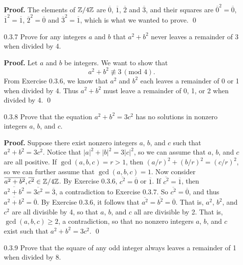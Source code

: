 \begin{enumerate}
      \textbf{Proof.} The elements of $\mathbb{Z}/4\mathbb{Z}$ are $\overline{0}$,
      $\overline{1}$, $\overline{2}$ and $\overline{3}$, and their squares are
      $\overline{0}^2 = \overline{0}$, $\overline{1}^2 = \overline{1}$,
      $\overline{2}^2 = \overline{0}$ and $\overline{3}^2 = \overline{1}$, which
      is what we wanted to prove. \qed
   \item[0.3.7]   Prove for any integers $a$ and $b$ that $a^2 + b^2$ never
                  leaves a remainder of 3 when divided by 4.
                  
      \textbf{Proof.} Let $a$ and $b$ be integers. We want to show that
      $$a^2 + b^2 \not\equiv 3 \,(\text{mod }4).$$
      From Exercise 0.3.6, we know that $a^2$ and $b^2$ each leaves a remainder
      of 0 or 1 when divided by 4. Thus $a^2 + b^2$ must leave a remainder of
      0, 1, or 2 when divided by 4. \qed
   \item[0.3.8]   Prove that the equation $a^2 + b^2 = 3c^2$ has no solutions in
                  nonzero integers $a$, $b$, and $c$.
                  
      \textbf{Proof.} Suppose there exist nonzero integers $a$, $b$, and $c$
      such that $a^2 + b^2 = 3c^2$. Notice that $|a|^2 + |b|^2 = 3|c|^2$, so we
      can assume that $a$, $b$, and $c$ are all positive. If
      $\gcd(a, b, c) = r > 1$, then $(a/r)^2 + (b/r)^2 = (c/r)^2$, so we can
      further assume that $\gcd(a, b, c) = 1$. Now consider
      $\overline{a^2+b^2}, \overline{c^2} \in \mathbb{Z}/4\mathbb{Z}$. By Exercise 0.3.6,
      $\overline{c^2} = \overline{0}$ or $\overline{1}$. If
      $\overline{c^2} = \overline{1}$, then
      $\overline{a^2 + b^2} = \overline{3c^2} = \overline{3}$, a contradiction
      to Exercise 0.3.7. So $\overline{c^2} = \overline{0}$, and thus
      $\overline{a^2 + b^2} = \overline{0}$. By Exercise 0.3.6, it follows that
      $\overline{a^2} = \overline{b^2} = \overline{0}$. That is, $a^2$, $b^2$, 
      and $c^2$ are all divisible by 4, so that $a$, $b$, and $c$ all are
      divisible by 2. That is, $\gcd(a, b, c) \ge 2$, a contradiction, so that
      no nonzero integers $a$, $b$, and $c$ exist such that
      $a^2 + b^2 = 3c^2$. \qed
   \item[0.3.9]   Prove that the square of any odd integer always leaves a
                  remainder of 1 when divided by 8.
                  

\end{enumerate}
